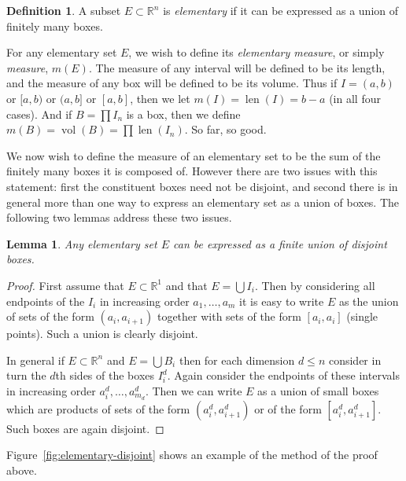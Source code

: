 \documentclass[11pt,oneside]{amsbook}
\newcommand{\RR}{{\mathbb R}}
\DeclareMathOperator{\len}{len}
\DeclareMathOperator{\vol}{vol}
\theoremstyle{definition}
\theoremstyle{plain}
\newtheorem{lem}[thm]{Lemma}
\theoremstyle{definition}
\newtheorem{defn}[thm]{Definition}
\theoremstyle{remark}
\numberwithin{equation}{section}
\numberwithin{figure}{section}
\begin{document}
\begin{defn}
  A subset $E\subset\RR^n$ is \emph{elementary} if it can be expressed as a union of finitely many boxes.
\end{defn}

For any elementary set $E$, we wish to define its \emph{elementary measure}, or simply \emph{measure}, $m(E)$. The measure of any interval will be defined to be its length, and the measure of any box will be defined to be its volume. Thus if $I=(a,b)$ or $[a,b)$ or $(a,b]$ or $[a,b]$, then we let $m(I)=\len(I)=b-a$ (in all four cases). And if $B=\prod I_n$ is a box, then we define $m(B)=\vol(B)=\prod\len(I_n)$. So far, so good.

We now wish to define the measure of an elementary set to be the sum of the finitely many boxes it is composed of. However there are two issues with this statement: first the constituent boxes need not be disjoint, and second there is in general more than one way to express an elementary set as a union of boxes. The following two lemmas address these two issues.

\begin{lem}
  Any elementary set $E$ can be expressed as a finite union of disjoint boxes.
\end{lem}

\begin{proof}
  First assume that $E\subset\RR^1$ and that $E=\bigcup I_i$. Then by considering all endpoints of the $I_i$ in increasing order $a_1,\ldots,a_m$ it is easy to write $E$ as the union of sets of the form $(a_i,a_{i+1})$ together with sets of the form $[a_i,a_i]$ (single points). Such a union is clearly disjoint.

  In general if $E\subset\RR^n$ and $E=\bigcup B_i$ then for each dimension $d\leq n$ consider in turn the $d$th sides of the boxes $I_i^d$. Again consider the endpoints of these intervals in increasing order $a_i^d,\ldots,a_{m_d}^d$. Then we can write $E$ as a union of small boxes which are products of sets of the form $(a_i^d,a_{i+1}^d)$ or of the form $[a_i^d,a_{i+1}^d]$. Such boxes are again disjoint.
\end{proof}

Figure~\ref{fig:elementary-disjoint} shows an example of the method of the proof above.
\end{document}
